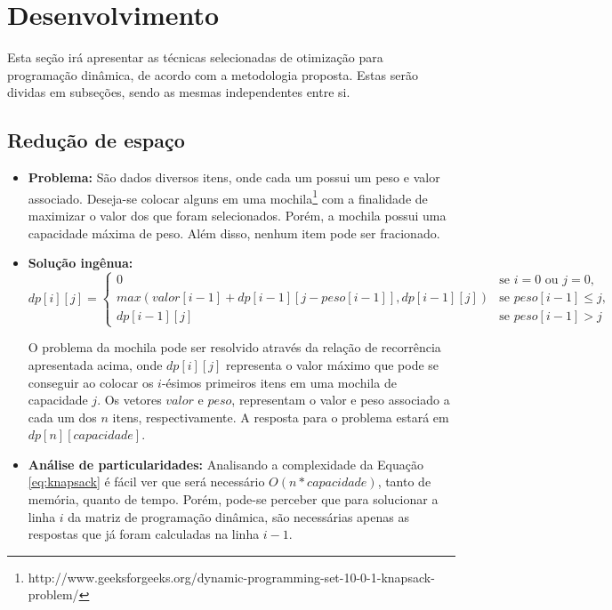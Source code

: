 \chapter{Desenvolvimento}
\label{chap:desenvolvimento}
\setcounter{lstlisting}{2}
\setcounter{equation}{2}
Esta seção irá apresentar as técnicas selecionadas de otimização para programação dinâmica, de acordo com a metodologia proposta. Estas serão dividas em subseções, sendo as mesmas independentes entre si.

\section{Redução de espaço}

\begin{itemize}[leftmargin=-.001in]
\item \textbf{Problema:}
 São dados diversos itens, onde cada um possui um peso e valor associado. Deseja-se colocar alguns em uma mochila\footnote{http://www.geeksforgeeks.org/dynamic-programming-set-10-0-1-knapsack-problem/} com a finalidade de maximizar o valor dos que foram selecionados. Porém, a mochila possui uma capacidade máxima de peso. Além disso, nenhum item pode ser fracionado.
\item \textbf{Solução ingênua:} 
\begin{equation}
dp[i][j] = 
\begin{cases}
0 &\text{se } i = 0 \text{ ou } j = 0,\\
max(valor[i-1] + dp[i-1][j-peso[i-1]], dp[i-1][j]) &\text{se } peso[i-1] \leq{j},\\
dp[i-1][j] &\text{se } peso[i-1] > j
\end{cases}
\label{eq:knapsack}
\end{equation}

O problema da mochila pode ser resolvido através da relação de recorrência apresentada acima, onde $dp[i][j]$ representa o valor máximo que pode se conseguir ao colocar os $i$-ésimos primeiros itens em uma mochila de capacidade $j$. Os vetores $valor$ e $peso$, representam o valor e peso associado a cada um dos $n$ itens, respectivamente. A resposta para o problema estará em $dp[n][capacidade]$.


\item \textbf{Análise de particularidades:}
Analisando a complexidade da Equação \ref{eq:knapsack} é fácil ver que será necessário $O(n*capacidade)$, tanto de memória, quanto de tempo. Porém, pode-se perceber que para solucionar a linha $i$ da matriz de programação dinâmica, são necessárias apenas as respostas que já foram calculadas na linha $i - 1$.



\end{itemize}
